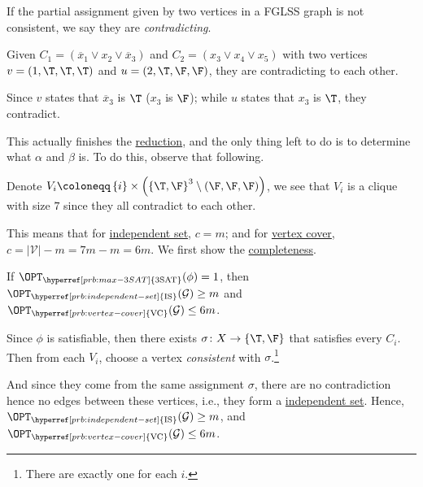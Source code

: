\begin{notation}[Contradiction]
	If the partial assignment given by two vertices in a FGLSS graph is not consistent, we say they are \emph{contradicting}.
\end{notation}
\begin{eg}
	Given \(C_1=(\overline{x}_1 \lor x_2 \lor \overline{x}_3)\) and \(C_2 = (x_3\lor x_4\lor x_5)\) with two vertices \(v=(1, \T, \T, \T)\) and \(u=(2, \T, \F, \F)\), they are contradicting to each other.
\end{eg}
\begin{explanation}
	Since \(v\) states that \(\overline{x}_3\) is \(\T\) (\(x_3\) is \(\F\)); while \(u\) states that \(x_3\) is \(\T\), they contradict.
\end{explanation}

This actually finishes the \hyperref[def:reduction]{reduction}, and the only thing left to do is to determine what \(\alpha \) and \(\beta \) is. To do this, observe that following.
\begin{remark}
	Denote \(V_i \coloneqq \left\{ i \right\} \times \left( \left\{ \T, \F \right\} ^3 \setminus (\F, \F, \F) \right)\), we see that \(V_i\) is a clique with size \(7\) since they all contradict to each other.
\end{remark}

This means that for \hyperref[prb:independent-set]{independent set}, \(c = m\); and for \hyperref[prb:vertex-cover]{vertex cover}, \(c = \vert \mathcal{V}  \vert - m = 7m - m = 6m\). We first show the \hyperref[def:completeness]{completeness}.

\begin{claim}
	If \(\OPT_{\hyperref[prb:max-3SAT]{\text{3SAT}}} (\phi) = 1\), then \(\OPT_{\hyperref[prb:independent-set]{\text{IS}} }(\mathcal{G} ) \geq m\) and \(\OPT_{\hyperref[prb:vertex-cover]{\text{VC}} }(\mathcal{G} ) \leq 6m\).
\end{claim}
\begin{explanation}
	Since \(\phi \) is satisfiable, then there exists \(\sigma \colon X \to \left\{ \T, \F \right\} \) that satisfies every \(C_i\). Then from each \(V_i\), choose a vertex \emph{consistent} with \(\sigma \).\footnote{There are exactly one for each \(i\).}

	And since they come from the same assignment \(\sigma \), there are no contradiction hence no edges between these vertices, i.e., they form a \hyperref[prb:independent-set]{independent set}. Hence, \(\OPT_{\hyperref[prb:independent-set]{\text{IS}} }(\mathcal{G} ) \geq m\), and \(\OPT_{\hyperref[prb:vertex-cover]{\text{VC}} }(\mathcal{G} ) \leq 6m\).
\end{explanation}

